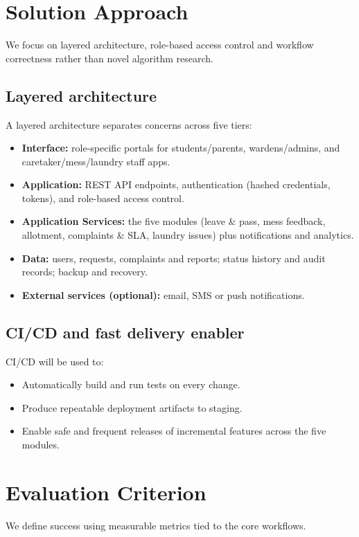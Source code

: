 \documentclass[11pt,a4paper]{article}
\begin{document}
\section{Solution Approach }
We focus on layered architecture, role-based access
control and workflow correctness rather than novel algorithm research.

\subsection{Layered architecture }
A layered architecture separates concerns across five tiers:
\begin{itemize}[leftmargin=0.7cm]
    \item \textbf{Interface:} role-specific portals for students/parents, wardens/admins, and
    caretaker/mess/laundry staff apps.
    \item \textbf{Application:} REST API endpoints, authentication (hashed credentials,
    tokens), and role-based access control.
    \item \textbf{Application Services:} the five modules (leave \& pass, mess feedback, allotment,
    complaints \& SLA, laundry issues) plus notifications and analytics.
    \item \textbf{Data:} users, requests, complaints and reports; status history and audit
    records; backup and recovery.
    \item \textbf{External services (optional):} email, SMS or push notifications.
\end{itemize}

\subsection{CI/CD and fast delivery enabler}
CI/CD will be used to:
\begin{itemize}[leftmargin=0.7cm]
    \item Automatically build and run tests on every change.
    \item Produce repeatable deployment artifacts to staging.
    \item Enable safe and frequent releases of incremental features across the five modules.
\end{itemize}

\section{Evaluation Criterion }
We define success using measurable metrics tied to the core workflows.
\end{document}
